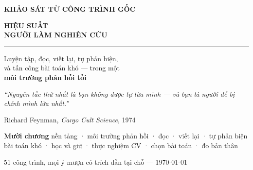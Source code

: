 \documentclass[11pt,a4paper,oneside]{report}
\begin{document}
\begin{titlepage}
\thispagestyle{empty}

\vspace*{4.2cm}
\begin{flushleft}
{\sffamily\bfseries\color{accent}\large KHẢO SÁT TỪ CÔNG TRÌNH GỐC\par}
\vspace{0.5cm}
{\sffamily\bfseries\color{inkblue}\fontsize{38}{43}\selectfont
HIỆU SUẤT\\[0.12em] NGƯỜI LÀM NGHIÊN CỨU\par}
\vspace{0.9cm}
{\color{accent}\rule{7cm}{2.4pt}}\par
\vspace{0.9cm}
{\large\color{inkblue!85}
Luyện tập, đọc, viết lại, tự phản biện,\\[0.25em]
và tấn công bài toán khó --- trong một\\[0.25em]
\textbf{môi trường phản hồi tồi}\par}
\end{flushleft}

\vfill
\begin{flushleft}
{\itshape\color{tiercol}``Nguyên tắc thứ nhất là bạn không được tự lừa mình --- và bạn là người dễ bị\\
chính mình lừa nhất.''\par}
{\footnotesize\sffamily\color{tiercol}Richard Feynman, \emph{Cargo Cult Science}, 1974\par}
\vspace{1.1cm}
{\footnotesize\sffamily\color{inkblue}\textbf{Mười chương}\quad
nền tảng · môi trường phản hồi · đọc · viết lại · tự phản biện\\[0.25em]
\quad bài toán khó · học và giữ · thực nghiệm CV · chọn bài toán · đo bản thân\par}
\vspace{0.5em}
{\footnotesize\sffamily\color{tiercol}51 công trình, mọi ý mượn có trích dẫn tại chỗ --- \today\par}
\end{flushleft}
\end{titlepage}


\cleardoublepage
\tableofcontents
\cleardoublepage
{}













\printbibliography[title={Công trình tham khảo}]
\end{document}
